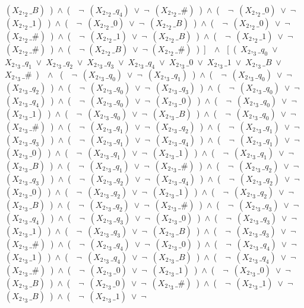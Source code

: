 ﻿\documentclass[a4paper,10pt]{article}
\begin{document}
$(X_2,_2\_B)$\ )\ $\wedge$\ (\ \ $\neg$\ $(X_2,_2\_q_4)$\ $\vee$\ $\neg$\ $(X_2,_2\_\#)$\ )\ $\wedge$\ (\ \ $\neg$\ $(X_2,_2\_0)$\ $\vee$\ $\neg$\ $(X_2,_2\_1)$\ )\ $\wedge$\ (\ \ $\neg$\ $(X_2,_2\_0)$\ $\vee$\ $\neg$\ $(X_2,_2\_B)$\ )\ $\wedge$\ (\ \ $\neg$\ $(X_2,_2\_0)$\ $\vee$\ $\neg$\ $(X_2,_2\_\#)$\ )\ $\wedge$\ (\ \ $\neg$\ $(X_2,_2\_1)$\ $\vee$\ $\neg$\ $(X_2,_2\_B)$\ )\ $\wedge$\ (\ \ $\neg$\ $(X_2,_2\_1)$\ $\vee$\ $\neg$\ $(X_2,_2\_\#)$\ )\ $\wedge$\ (\ \ $\neg$ $(X_2,_2\_B)$\ $\vee$\ $\neg$ $(X_2,_2\_\#)$\ )\ ]\ \ $\wedge$ \ [\ (\ $X_2,_3\_q_0$\ $\vee$\ $X_2,_3\_q_1$\ $\vee$\ $X_2,_3\_q_2$\ $\vee$\ $X_2,_3\_q_3$\ $\vee$\ $X_2,_3\_q_4$\ $\vee$\ $X_2,_3\_0$\ $\vee$\ $X_2,_3\_1$\ $\vee$\ $X_2,_3\_B$\ $\vee$\ $X_2,_3\_\#$\ )\ \ $\wedge$ \ (\ \ $\neg$\ $(X_2,_3\_q_0)$\ $\vee$\ $\neg$\ $(X_2,_3\_q_1)$\ )\ $\wedge$\ (\ \ $\neg$\ $(X_2,_3\_q_0)$\ $\vee$\ $\neg$\ $(X_2,_3\_q_2)$\ )\ $\wedge$\ (\ \ $\neg$\ $(X_2,_3\_q_0)$\ $\vee$\ $\neg$\ $(X_2,_3\_q_3)$\ )\ $\wedge$\ (\ \ $\neg$\ $(X_2,_3\_q_0)$\ $\vee$\ $\neg$\ $(X_2,_3\_q_4)$\ )\ $\wedge$\ (\ \ $\neg$\ $(X_2,_3\_q_0)$\ $\vee$\ $\neg$\ $(X_2,_3\_0)$\ )\ $\wedge$\ (\ \ $\neg$\ $(X_2,_3\_q_0)$\ $\vee$\ $\neg$\ $(X_2,_3\_1)$\ )\ $\wedge$\ (\ \ $\neg$\ $(X_2,_3\_q_0)$\ $\vee$\ $\neg$\ $(X_2,_3\_B)$\ )\ $\wedge$\ (\ \ $\neg$\ $(X_2,_3\_q_0)$\ $\vee$\ $\neg$\ $(X_2,_3\_\#)$\ )\ $\wedge$\ (\ \ $\neg$\ $(X_2,_3\_q_1)$\ $\vee$\ $\neg$\ $(X_2,_3\_q_2)$\ )\ $\wedge$\ (\ \ $\neg$\ $(X_2,_3\_q_1)$\ $\vee$\ $\neg$\ $(X_2,_3\_q_3)$\ )\ $\wedge$\ (\ \ $\neg$\ $(X_2,_3\_q_1)$\ $\vee$\ $\neg$\ $(X_2,_3\_q_4)$\ )\ $\wedge$\ (\ \ $\neg$\ $(X_2,_3\_q_1)$\ $\vee$\ $\neg$\ $(X_2,_3\_0)$\ )\ $\wedge$\ (\ \ $\neg$\ $(X_2,_3\_q_1)$\ $\vee$\ $\neg$\ $(X_2,_3\_1)$\ )\ $\wedge$\ (\ \ $\neg$\ $(X_2,_3\_q_1)$\ $\vee$\ $\neg$\ $(X_2,_3\_B)$\ )\ $\wedge$\ (\ \ $\neg$\ $(X_2,_3\_q_1)$\ $\vee$\ $\neg$\ $(X_2,_3\_\#)$\ )\ $\wedge$\ (\ \ $\neg$\ $(X_2,_3\_q_2)$\ $\vee$\ $\neg$\ $(X_2,_3\_q_3)$\ )\ $\wedge$\ (\ \ $\neg$\ $(X_2,_3\_q_2)$\ $\vee$\ $\neg$\ $(X_2,_3\_q_4)$\ )\ $\wedge$\ (\ \ $\neg$\ $(X_2,_3\_q_2)$\ $\vee$\ $\neg$\ $(X_2,_3\_0)$\ )\ $\wedge$\ (\ \ $\neg$\ $(X_2,_3\_q_2)$\ $\vee$\ $\neg$\ $(X_2,_3\_1)$\ )\ $\wedge$\ (\ \ $\neg$\ $(X_2,_3\_q_2)$\ $\vee$\ $\neg$\ $(X_2,_3\_B)$\ )\ $\wedge$\ (\ \ $\neg$\ $(X_2,_3\_q_2)$\ $\vee$\ $\neg$\ $(X_2,_3\_\#)$\ )\ $\wedge$\ (\ \ $\neg$\ $(X_2,_3\_q_3)$\ $\vee$\ $\neg$\ $(X_2,_3\_q_4)$\ )\ $\wedge$\ (\ \ $\neg$\ $(X_2,_3\_q_3)$\ $\vee$\ $\neg$\ $(X_2,_3\_0)$\ )\ $\wedge$\ (\ \ $\neg$\ $(X_2,_3\_q_3)$\ $\vee$\ $\neg$\ $(X_2,_3\_1)$\ )\ $\wedge$\ (\ \ $\neg$\ $(X_2,_3\_q_3)$\ $\vee$\ $\neg$\ $(X_2,_3\_B)$\ )\ $\wedge$\ (\ \ $\neg$\ $(X_2,_3\_q_3)$\ $\vee$\ $\neg$\ $(X_2,_3\_\#)$\ )\ $\wedge$\ (\ \ $\neg$\ $(X_2,_3\_q_4)$\ $\vee$\ $\neg$\ $(X_2,_3\_0)$\ )\ $\wedge$\ (\ \ $\neg$\ $(X_2,_3\_q_4)$\ $\vee$\ $\neg$\ $(X_2,_3\_1)$\ )\ $\wedge$\ (\ \ $\neg$\ $(X_2,_3\_q_4)$\ $\vee$\ $\neg$\ $(X_2,_3\_B)$\ )\ $\wedge$\ (\ \ $\neg$\ $(X_2,_3\_q_4)$\ $\vee$\ $\neg$\ $(X_2,_3\_\#)$\ )\ $\wedge$\ (\ \ $\neg$\ $(X_2,_3\_0)$\ $\vee$\ $\neg$\ $(X_2,_3\_1)$\ )\ $\wedge$\ (\ \ $\neg$\ $(X_2,_3\_0)$\ $\vee$\ $\neg$\ $(X_2,_3\_B)$\ )\ $\wedge$\ (\ \ $\neg$\ $(X_2,_3\_0)$\ $\vee$\ $\neg$\ $(X_2,_3\_\#)$\ )\ $\wedge$\ (\ \ $\neg$\ $(X_2,_3\_1)$\ $\vee$\ $\neg$\ $(X_2,_3\_B)$\ )\ $\wedge$\ (\ \ $\neg$\ $(X_2,_3\_1)$\ $\vee$\ $\neg$\ 
\end{document}
